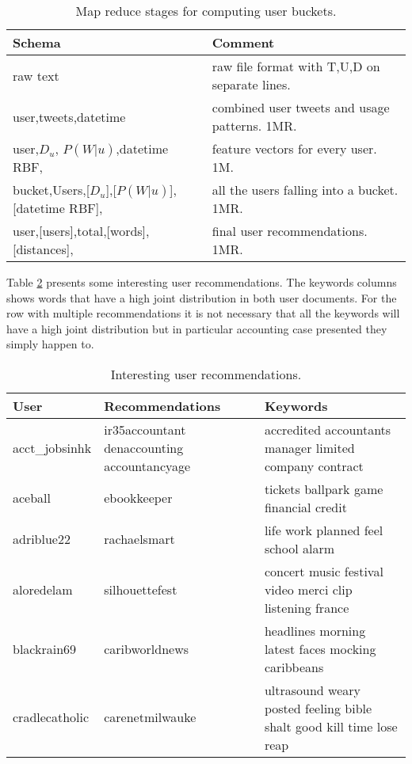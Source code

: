 \documentclass{article}
\begin{document}
  \begin{table}
    \begin{center}
     \begin{tabular}{ | l | l | }
     \hline
     \textbf{Schema} & \textbf{Comment}   \\ \hline
     raw text & raw file format with T,U,D on separate lines.  \\ \hline
     user,tweets,datetime & combined user tweets and usage patterns. 1MR.  \\ \hline
     user,$D_u$, $P(W|u)$,datetime RBF, & feature vectors for every user. 1M.  \\ \hline
     bucket,Users,[$D_u$],[$P(W|u)$],[datetime RBF], & all the users falling into a bucket. 1MR.  \\ \hline
     user,[users],total,[words],[distances], & final user recommendations. 1MR.  \\ \hline
     \end{tabular}
     \caption{Map reduce stages for computing user buckets.}
     \label{tab:mapreduce}
     \end{center}
   \end{table}
 
Table \ref{tab:buckets} presents some interesting user recommendations. The keywords columns 
shows words that have a high joint distribution in both user documents. For the row with multiple
recommendations it is not necessary that all the keywords will have a high joint distribution but
in particular accounting case presented they simply happen to.
 
\begin{table}
    \begin{center}
     \begin{tabular}{ | l | p{4cm} | p{7cm} | }
     \hline
     \textbf{User} & \textbf{Recommendations} & \textbf{Keywords}   \\ \hline
     acct\_jobsinhk & ir35accountant denaccounting accountancyage & accredited accountants manager limited company contract  \\ \hline
     aceball & ebookkeeper & tickets ballpark game financial credit  \\ \hline
     adriblue22 & rachaelsmart & life work planned feel school alarm \\ \hline
     aloredelam & silhouettefest & concert music festival video merci clip listening france  \\ \hline
     blackrain69 & caribworldnews & headlines morning latest faces mocking caribbeans  \\ \hline
     cradlecatholic & carenetmilwauke & ultrasound weary posted feeling bible shalt good kill time lose reap  \\ \hline
     \end{tabular}
     \caption{Interesting user recommendations.}
     \label{tab:buckets}
     \end{center}
\end{table}
\end{document}
